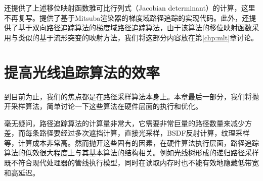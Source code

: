 \cite{a:GradientDomainPathTracing}还提供了上述移位映射函数雅可比行列式（Jacobian determinant）的计算，这里不再复写。\cite{a:GradientdomainpathtracingGPTandgradientdomainbidirectionalpathtracingGBDPTforMitsubarenderer}提供了基于Mitsuba渲染器的梯度域路径追踪的实现代码。此外，\cite{a:Gradient-DomainBidirectionalPathTracing}还提供了基于双向路径追踪算法的梯度域路径追踪算法，由于该算法的移位映射函数采用与\cite{a:ImprovedSamplingforGradientDomainMetropolisLightTransport}类似的基于流形突变的映射方法，我们将这部分内容放在第\ref{chp:mlt}章讨论。




	

\section{提高光线追踪算法的效率}\label{sec:pt-efficiency}
到目前为止，我们的焦点都是在路径采样算法本身上。本章最后一部分，我们将抛开采样算法，简单讨论一下这些算法在硬件层面的执行和优化。

毫无疑问，路径追踪算法的计算量非常大，它需要非常巨量的路径数量来减少方差，而每条路径要经过多次遮挡计算，直接光采样，BSDF反射计算，纹理采样等，计算成本非常高。然而抛开这些固有的因素，在硬件算法执行层面，路径追踪算法的低效很大程度上与其基本算法的结构相关。例如光线树形成的递归路径采样既不符合现代处理器的管线执行模型，同时在读取内存时也不能有效地隐藏低带宽和高延迟。

